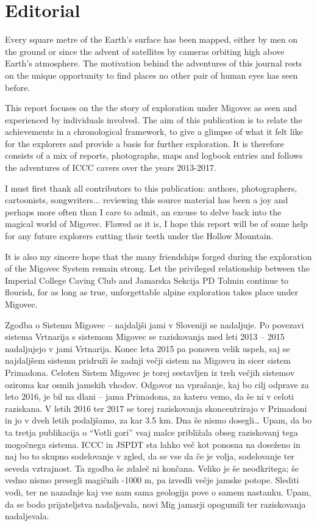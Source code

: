 \chapter*{Editorial}

Every square metre of the Earth's surface has been mapped, either by men on the ground or since the advent of satellites by cameras orbiting high above Earth's atmosphere. The motivation behind the adventures of this journal rests on the unique opportunity to find places no other pair of human eyes has seen before.

This report focuses on the the story of exploration under Migovec as seen and experienced by individuals involved. The aim of this publication is to relate the achievements in a chronological framework, to give a glimpse of what it felt like for the explorers and provide a basis for further exploration. It is therefore consists of a mix of reports, photographs, maps and logbook entries and follows the adventures of ICCC cavers over the years 2013-2017.

I must first thank all contributors to this publication: authors, photographers, cartoonists, songwriters... reviewing this source material has been a joy and perhaps more often than I care to admit, an excuse to delve back into the magical world of Migovec. Flawed as it is, I hope this report will be of some help for any future explorers cutting their teeth under the Hollow Mountain. 

It is also my sincere hope that the many friendships forged during the exploration of the Migovec System remain strong. Let the privileged relationship between the Imperial College Caving Club and Jamarska Sekcija PD Tolmin continue to flourish, for as long as true, unforgettable alpine exploration takes place under Migovec.



Zgodba o Sistemu Migovec – najdaljši jami v Sloveniji se nadaljuje. Po povezavi sistema Vrtnarija s sistemom Migovec se raziskovanja med leti 2013 – 2015 nadaljujejo v jami Vrtnarija. Konec leta 2015 pa ponoven velik uspeh, saj se najdaljšem sistemu pridruži še zadnji večji sistem na Migovcu in sicer sistem Primadona. Celoten Sistem Migovec je torej sestavljen iz treh večjih sistemov oziroma kar osmih jamskih vhodov. Odgovor na vprašanje, kaj bo cilj odprave za leto 2016, je bil na dlani – jama Primadona, za katero vemo, da še ni v celoti raziskana. V letih 2016 ter 2017 se torej  raziskovanja skoncentrirajo v Primadoni in jo v dveh letih podaljšamo, za kar 3.5 km. Dna še nismo dosegli…
Upam, da bo ta tretja publikacija o “Votli gori” vsaj malce približala obseg raziskovanj tega mogočnega sistema. 
ICCC in JSPDT sta lahko več kot ponosna na doseženo in naj bo to skupno sodelovanje v zgled, da se vse da če je volja, sodelovanje ter seveda vztrajnost. 
Ta zgodba še zdaleč ni končana. Veliko je še neodkritega; še vedno nismo presegli magičnih -1000 m, pa izvedli večje jamske potope. Slediti vodi, ter ne nazadnje kaj vse nam sama geologija pove o samem nastanku.  
Upam, da se bodo prijateljstva nadaljevala, novi Mig jamarji opogumili ter raziskovanja nadaljevala. 

